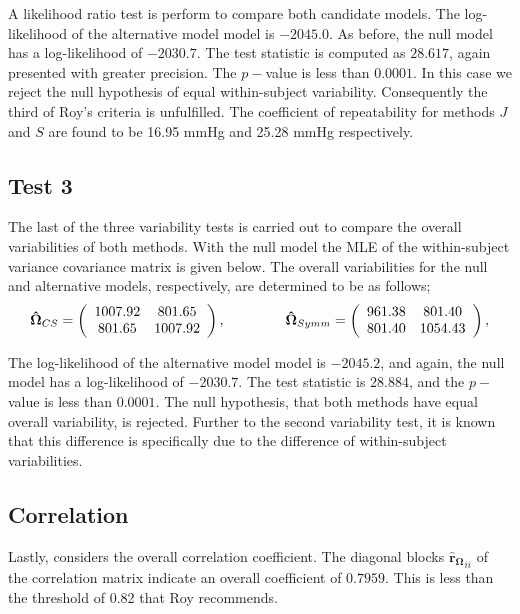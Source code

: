 A likelihood ratio test is perform to compare both candidate models. The log-likelihood of the alternative model model is $-2045.0$. As before, the null model has a log-likelihood of $-2030.7$. The test statistic is computed as $28.617$, again presented with greater precision. The $p-$value is less than $0.0001$. In this case we reject the null hypothesis of equal within-subject variability. Consequently the third of Roy's criteria is unfulfilled.
The coefficient of repeatability for methods $J$ and $S$ are found to be 16.95 mmHg and 25.28 mmHg respectively.

\subsection{Test 3}
The last of the three variability tests is carried out to compare the overall variabilities of both methods.
With the null model the MLE of the within-subject variance covariance matrix is given below. The overall variabilities for the null and alternative models, respectively, are determined to be as follows;
\[
\boldsymbol{\hat{\Omega}}_{CS} = \left( \begin{array}{cc}
1007.92  & 801.65  \\
801.65  & 1007.92  \\
\end{array}\right),
\hspace{1.5cm}
\boldsymbol{\hat{\Omega}}_{Symm} = \left( \begin{array}{cc}
961.38 & 801.40  \\
801.40 & 1054.43  \\
\end{array}\right),
\]

The log-likelihood of the alternative model model is $-2045.2$, and again, the null model has a log-likelihood of $-2030.7$. The test statistic is $28.884$, and the $p-$value is less than $0.0001$. The null hypothesis, that both methods have equal overall variability, is rejected. Further to the second variability test, it is known that this difference is specifically due to the difference of within-subject variabilities.

\subsection{Correlation}
Lastly, \citet{Roy2009} considers the overall correlation coefficient. The diagonal blocks $\boldsymbol{\hat{r}_{\Omega}}_{ii}$ of the correlation matrix indicate an overall coefficient of $0.7959$. This is less than the threshold of 0.82 that Roy recommends.


